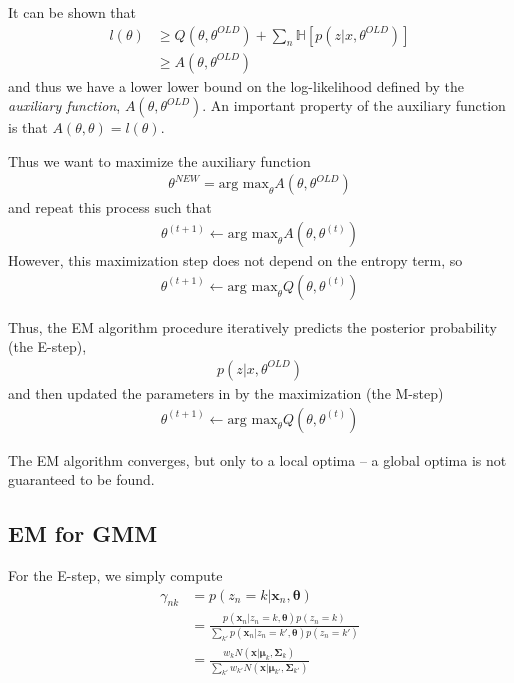 \documentclass[11pt]{article}
\newcommand{\vct}[1]{\boldsymbol{#1}} %
\newcommand{\mat}[1]{\boldsymbol{#1}} %
\newcommand{\ProbOpr}[1]{\mathbb{#1}}
\begin{document}
It can be shown that
\begin{align*}
l(\theta) &\ge Q(\theta,\theta^{OLD} )+  \sum_n\ProbOpr{H}[p(z|x, \theta^{OLD})]\\
&\ge A(\theta,\theta^{OLD} )
\end{align*}
and thus we have a lower lower bound on the log-likelihood defined by the {\it auxiliary function},  $A(\theta,\theta^{OLD} )$. An important property of the auxiliary function is that $A(\theta,\theta ) = l(\theta)$.

Thus we want to maximize the auxiliary function
\begin{align*}
\theta^{NEW} = \text{arg max}_\theta A(\theta,\theta^{OLD} )
\end{align*}
and repeat this process such that
\begin{align*}
\theta^{(t+1)} \gets \text{arg max}_\theta A(\theta,\theta^{(t)} )
\end{align*}
However, this maximization step does not depend on the entropy term, so
\begin{align*}
\theta^{(t+1)} \gets \text{arg max}_\theta Q(\theta,\theta^{(t)} )
\end{align*}

Thus, the EM algorithm procedure iteratively predicts the posterior probability (the E-step),
\begin{align*}
p(z|x, \theta^{OLD})
\end{align*}
and then updated the parameters in by the maximization (the M-step)
\begin{align*}
\theta^{(t+1)} \gets \text{arg max}_\theta Q(\theta,\theta^{(t)} )
\end{align*}

 The EM algorithm converges, but only to a local optima -- a global optima is not guaranteed to be found.

\subsection{EM for GMM}
For the E-step, we simply compute
\begin{align*}
\gamma_{nk} &= p(z_n=k|\vct{x}_n, \mat{\theta})\\
&= \frac{p(\vct{x}_n|z_n=k, \mat{\theta})p(z_n=k)}{\sum_{k'} p(\vct{x}_n|z_n=k', \mat{\theta})p(z_n=k')}\\
&= \frac{ w_k N(\vct{x}|\vct{\mu}_k, \mat{\Sigma}_k)}{\sum_{k'}  w_{k'} N(\vct{x}|\vct{\mu}_{k'}, \mat{\Sigma}_{k'})}
\end{align*}
\end{document}
